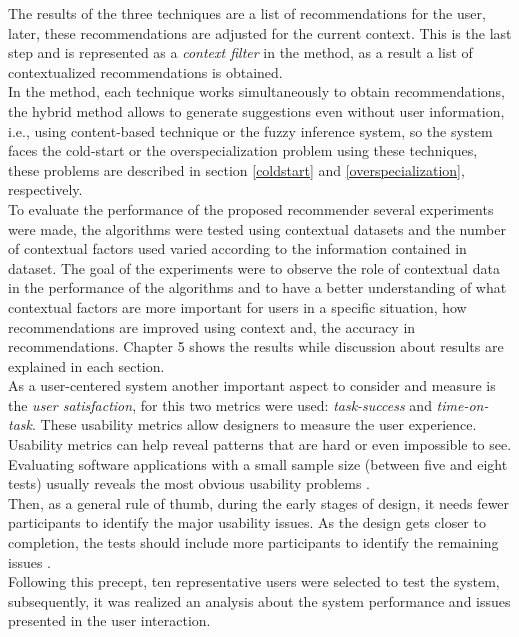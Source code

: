The results of the three techniques are a list of recommendations for
the user, later, these recommendations are adjusted for the current context.
This is the last step and is represented as a \textit{context filter} in the
method, as a result a list of contextualized
recommendations is obtained. \\
In the method, each technique works simultaneously to obtain
recommendations, the hybrid method allows to generate suggestions even
without user information, i.e., using content-based technique or the
fuzzy inference system, so the system faces the cold-start or the
overspecialization problem using these techniques, these problems are
described in section \ref{coldstart} and 
 \ref{overspecialization}, respectively.\\
To evaluate the performance of the proposed recommender several experiments
were made, the algorithms were tested using contextual datasets and
the number of contextual factors used varied according to the information
contained in dataset. The goal of the experiments were to observe
the role of contextual data  in the performance of the algorithms and to 
have a better understanding of what contextual
factors are more important for users in a specific situation, how recommendations
are improved using context and, the accuracy in recommendations.
Chapter 5 shows the results while discussion about results are
explained in each section.\\
As a user-centered system another important aspect 
to consider and measure is the \textit{user satisfaction}, for this two
metrics were used: \textit{task-success} and \textit
{time-on-task}. These usability metrics allow designers to measure 
the user experience.
\\ Usability
metrics can help reveal patterns that are hard or even impossible to
see. Evaluating software applications with a small sample size 
(between five and eight tests) usually reveals the most obvious 
usability problems \cite{albert2013measuring}.\\ 
Then, as a general rule of thumb, during the early stages of design, 
it needs fewer participants to identify the major usability issues. 
As the design gets closer to completion, the tests should include more
participants to identify the remaining issues \cite{albert2013measuring}.\\ 
Following this precept, ten representative users were selected to test
the system, subsequently, it was realized an analysis about the system
performance and issues presented in the user interaction. 

